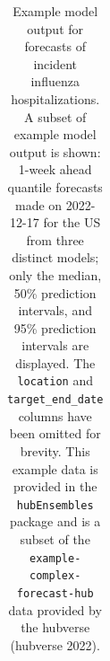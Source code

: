 \documentclass[
]{article}
\begin{document}
\begin{longtable}[]{@{}
  >{\raggedright\arraybackslash}p{}
  >{\raggedright\arraybackslash}p{}
  >{\raggedleft\arraybackslash}p{}
  >{\raggedright\arraybackslash}p{}
  >{\raggedright\arraybackslash}p{}
  >{\raggedright\arraybackslash}p{}
  >{\raggedleft\arraybackslash}p{}@{}}

\caption{\label{tbl-example-forecasts}Example model output for forecasts
of incident influenza hospitalizations. A subset of example model output
is shown: 1-week ahead quantile forecasts made on 2022-12-17 for the US
from three distinct models; only the median, 50\% prediction intervals,
and 95\% prediction intervals are displayed. The \texttt{location} and
\texttt{target\_end\_date} columns have been omitted for brevity. This
example data is provided in the \texttt{hubEnsembles} package and is a
subset of the \texttt{example-complex-forecast-hub} data provided by the
hubverse (hubverse 2022).}

\tabularnewline


\end{longtable}
\end{document}
